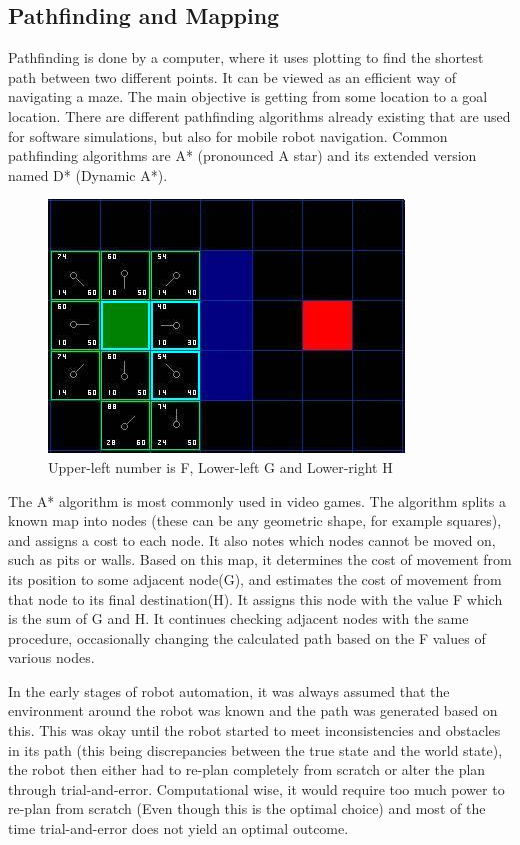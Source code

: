\subsection{Pathfinding and Mapping}

Pathfinding is done by a computer, where it uses plotting to find the shortest path between two different points. It can be viewed as an efficient way of navigating a maze. The main objective is getting from some location to a goal location.
There are different pathfinding algorithms already existing that are used for software simulations, but also for mobile robot navigation. Common pathfinding algorithms are A* (pronounced A star) and its extended version named D* (Dynamic A*).

\begin{figure}[H]
	\centering
	\includegraphics[width=.7\linewidth]{images/aStar2.jpg}
	\caption{Upper-left number is F, Lower-left G and Lower-right H}
	\label{fig:sub2}
\end{figure}

The A* algorithm is most commonly used in video games. The algorithm splits a known map into nodes (these can be any geometric shape, for example squares), and assigns a cost to each node. It also notes which nodes cannot be moved on, such as pits or walls. Based on this map, it determines the cost of movement from its position to some adjacent node(G), and estimates the cost of movement from that node to its final destination(H). It assigns this node with the value F which is the sum of G and H. It continues checking adjacent nodes with the same procedure, occasionally changing the calculated path based on the F values of various nodes\cite{astar}.

In the early stages of robot automation, it was always assumed that the environment around the robot was known and the path was generated based on this. This was okay until the robot started to meet inconsistencies and obstacles in its path (this being discrepancies between the true state and the world state), the robot then either had to re-plan completely from scratch or alter the plan through trial-and-error. Computational wise, it would require too much power to re-plan from scratch (Even though this is the optimal choice) and most of the time trial-and-error does not yield an optimal outcome.

